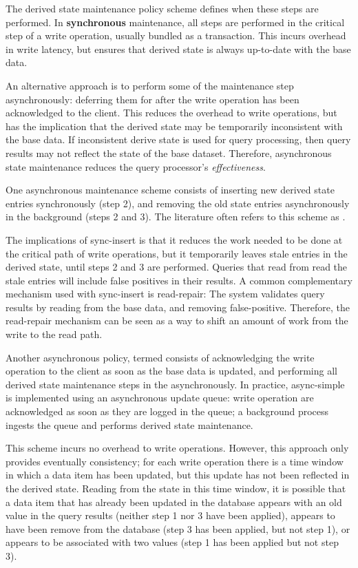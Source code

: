 The derived state maintenance policy scheme defines when these steps are performed.
In \textbf{synchronous} maintenance, all steps are performed in the critical step of a write operation, usually bundled
as a transaction.
This incurs overhead in write latency, but ensures that derived state is always up-to-date with the base data.

An alternative approach is to perform some of the maintenance step asynchronously: deferring them for after the write
operation has been acknowledged to the client.
This reduces the overhead to write operations, but has the implication that the derived state may be temporarily
inconsistent with the base data.
If inconsistent derive state is used for query processing, then query results may not reflect the state of the base
dataset.
Therefore, asynchronous state maintenance reduces the query processor's \textit{effectiveness}.

\bigskip



\medskip

\noindent
One asynchronous maintenance scheme consists of inserting new derived state entries synchronously (step 2),
and removing the old state entries asynchronously in the background (steps 2 and 3).
The literature often refers to this scheme as .

The implications of sync-insert is that it reduces the work needed to be done at the critical path of write operations,
but it temporarily leaves stale entries in the derived state, until steps 2 and 3 are performed.
Queries that read from read the stale entries will include false positives in their results.
A common complementary mechanism used with sync-insert is read-repair:
The system validates query results by reading from the base data, and removing false-positive.
Therefore, the read-repair mechanism can be seen as a way to shift an amount of work from the write to the read path.

Another asynchronous policy, termed  consists of acknowledging the write operation to the client as
soon as the base data is updated, and performing all derived state maintenance steps in the asynchronously.
In practice, async-simple is implemented using an asynchronous update queue: write operation are acknowledged as soon
as they are logged in the queue; a background process ingests the queue and performs derived state maintenance.

This scheme incurs no overhead to write operations.
However, this approach only provides eventually consistency;
for each write operation there is a time window in which a data item has been updated, but this update has not been
reflected in the derived state.
Reading from the state in this time window, it is possible that a data item that has already been updated in the database
appears with an old value in the query results (neither step 1 nor 3 have been applied), appears to have been remove
from the database (step 3 has been applied, but not step 1), or appears to be associated with two values (step 1 has
been applied but not step 3).

